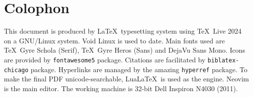 \clearpage
{}
{}
\chapter*{Colophon}

This document is produced by \LaTeX\ typesetting system using \TeX\ Live 2024 on a GNU/Linux system. Void Linux is used to date. Main fonts used are \TeX\ Gyre Schola (Serif), \TeX\ Gyre Heros (Sans) and DejaVu Sans Mono. Icons are provided by \texttt{fontawesome5} package. Citations are facilitated by \texttt{biblatex-chicago} package. Hyperlinks are managed by the amazing \texttt{hyperref} package. To make the final PDF unicode-searchable, Lua\LaTeX\ is used as the engine. Neovim is the main editor. The working machine is 32-bit Dell Inspiron N4030 (2011).
